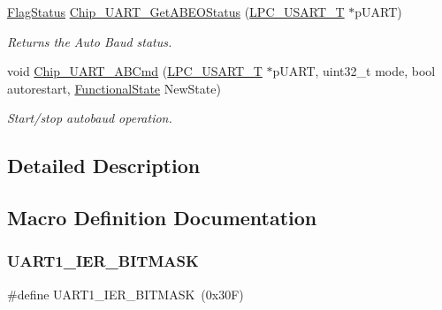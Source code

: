 \begin{DoxyCompactItemize}
\hyperlink{group___l_p_c___types___public___types_ga89136caac2e14c55151f527ac02daaff}{Flag\+Status} \hyperlink{group___u_a_r_t__18_x_x__43_x_x_ga6d1d74a73290b145868a88e6b5635093}{Chip\+\_\+\+U\+A\+R\+T\+\_\+\+Get\+A\+B\+E\+O\+Status} (\hyperlink{struct_l_p_c___u_s_a_r_t___t}{L\+P\+C\+\_\+\+U\+S\+A\+R\+T\+\_\+T} $\ast$p\+U\+A\+RT)
\begin{DoxyCompactList}\small\item\em Returns the Auto Baud status. \end{DoxyCompactList}\item 
void \hyperlink{group___u_a_r_t__18_x_x__43_x_x_ga9aa733f176891043bb1dd4d87940187f}{Chip\+\_\+\+U\+A\+R\+T\+\_\+\+A\+B\+Cmd} (\hyperlink{struct_l_p_c___u_s_a_r_t___t}{L\+P\+C\+\_\+\+U\+S\+A\+R\+T\+\_\+T} $\ast$p\+U\+A\+RT, uint32\+\_\+t mode, bool autorestart, \hyperlink{group___l_p_c___types___public___types_gac9a7e9a35d2513ec15c3b537aaa4fba1}{Functional\+State} New\+State)
\begin{DoxyCompactList}\small\item\em Start/stop autobaud operation. \end{DoxyCompactList}\end{DoxyCompactItemize}


\subsection{Detailed Description}


\subsection{Macro Definition Documentation}
\mbox{\label{group___u_a_r_t__18_x_x__43_x_x_ga145046fd9bd1d318acffd4770a7432ec}} 
\subsubsection{\texorpdfstring{U\+A\+R\+T1\+\_\+\+I\+E\+R\+\_\+\+B\+I\+T\+M\+A\+SK}{UART1\_IER\_BITMASK}}
{\footnotesize\ttfamily \#define U\+A\+R\+T1\+\_\+\+I\+E\+R\+\_\+\+B\+I\+T\+M\+A\+SK~(0x30\+F)}

